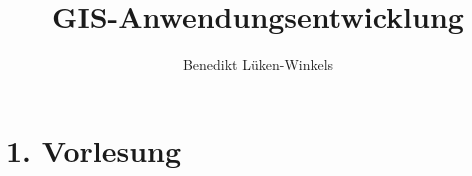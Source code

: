 \documentclass[ngerman]{scrartcl}
\title{GIS-Anwendungsentwicklung}
\author{Benedikt Lüken-Winkels}
\begin{document}
\maketitle
\tableofcontents
\newpage

\section{1. Vorlesung}
\end{document}
